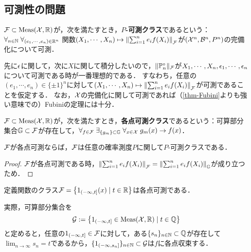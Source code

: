 \documentclass[uplatex,dvipdfmx]{jsreport}
\begin{document}
\subsection{可測性の問題}

\begin{definition}\label{def-measurable-class}
    $\mathcal{F}\subset\mathrm{Meas}(\mathcal{X},\mathbb{R})$が，次を満たすとき，\textbf{$P$-可測クラス}であるという：
    $\forall_{n\in\mathbb{N}}\;\forall_{(e_1,\cdots,e_n)\in\mathbb{R}^n}\;$関数$(X_1,\cdots,X_n)\mapsto\left\|\sum^n_{i=1}e_if(X_i)\right\|_{\mathcal{F}}$が$(\mathcal{X}^n,\mathcal{B}^n,P^n)$の完備化について可測．
\end{definition}
\begin{remarks}
    先に$\epsilon$に関して，次に$X$に関して積分したいので，$\|\mathbb{P}^\circ_n\|_{\mathcal{F}}$が$X_1,\cdots,X_n,\epsilon_1,\cdots,\epsilon_n$について可測である時が一番理想的である．
    すなわち，任意の$(e_1,\cdots,e_n)\in\{\pm 1\}^n$に対して$(X_1,\cdots,X_n)\mapsto\left\|\sum^n_{i=1}e_if(X_i)\right\|_{\mathcal{F}}$が可測であることを仮定する．
    なお，$\mathcal{X}$の完備化に関して可測であれば（\ref{thm-Fubini}よりも強い意味での）Fubiniの定理には十分．
\end{remarks}

\begin{definition}
    $\mathcal{F}\subset\mathrm{Meas}(\mathcal{X},\mathbb{R})$が，次を満たすとき，\textbf{各点可測クラス}であるという：可算部分集合$\mathbb{G}\subset\mathcal{F}$が存在して，$\forall_{f\in\mathcal{F}}\;\exists_{\{g_m\}\subset\mathbb{G}}\;\forall_{x\in\mathcal{X}}\;g_m(x)\to f(x)$．
\end{definition}

\begin{lemma}
    $\mathcal{F}$が各点可測ならば，$\mathcal{F}$は任意の確率測度$P$に関して$P$-可測クラスである．
\end{lemma}
\begin{proof}
    $\mathcal{F}$が各点可測である時，$\left\|\sum^n_{i=1}e_if(X_i)\right\|_{\mathcal{F}}=\left\|\sum^n_{i=1}e_if(X_i)\right\|_{\mathbb{G}}$が成り立つため．
\end{proof}

\begin{example}\label{exp-pointwise-measurable}
    定義関数のクラス$\mathcal{F}=\left\{1_{(-\infty,t]}(x)\mid t\in\mathbb{R}\right\}$は各点可測である．

    実際，可算部分集合を
    \[\mathcal{G}:=\left\{1_{(-\infty,t]}\in\mathrm{Meas}(\mathcal{X},\mathbb{R})\mid t\in\mathbb{Q}\right\}\]
    と定めると，任意の$1_{(-\infty,t]}\in\mathcal{F}$に対して，ある$\{s_n\}_{n\in\mathbb{N}}\subset\mathbb{Q}$が存在して$\lim_{n\to\infty}s_n=t$であるから，$\{1_{(-\infty,s_n]}\}_{n\in\mathbb{N}}\subset\mathcal{G}$は$f$に各点収束する．
\end{example}
\end{document}
